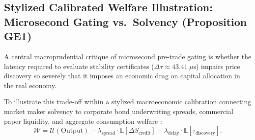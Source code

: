 \documentclass[10pt,twocolumn,letterpaper]{article}
\theoremstyle{definition}
\theoremstyle{remark}
\begin{document}
\subsection{Stylized Calibrated Welfare Illustration: Microsecond Gating vs.\ Solvency (Proposition GE1)}
\label{sec:macro_general_equilibrium}
A central macroprudential critique of microsecond pre-trade gating is whether the latency required to evaluate stability certificates ($\Delta \tau \approx 43.41~\mu\text{s}$) impairs price discovery so severely that it imposes an economic drag on capital allocation in the real economy.

To illustrate this trade-off within a stylized macroeconomic calibration connecting market maker solvency to corporate bond underwriting spreads, commercial paper liquidity, and aggregate consumption welfare \citep{brunnermeier2009,almgren2000}:
\begin{equation}
\mathcal{W} = \mathcal{U}(\text{Output}) - \lambda_{\text{spread}} \cdot \mathbb{E}[\Delta S_{\text{credit}}] - \lambda_{\text{delay}} \cdot \mathbb{E}[\tau_{\text{discovery}}].
\end{equation}
\end{document}
